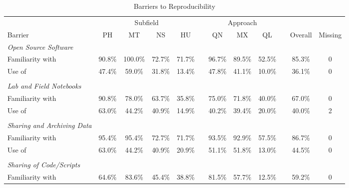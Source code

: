 \documentclass[]{interact}
\theoremstyle{plain}%
\theoremstyle{definition}
\theoremstyle{remark}
\begin{document}
\newpage
\begin{landscape}
\begin{table}[h]
    \centering
    \begin{threeparttable}
    \caption{Barriers to Reproducibility}
    \begin{tabular}{l c c c c c c c c c c c}
         \hline
                    & \multicolumn{4}{1}{Subfield}  & & \multicolumn{3}{1}{Approach} & & & \\
         Barrier                            & PH & MT & NS & HU                   & & QN & MX & QL           & & Overall & Missing \\
         \hline
         \textit{Open Source Software}      & & & & & & & & & & & \\
         Familiarity with                   & 90.8\% & 100.0\% & 72.7\% & 71.7\% & & 96.7\% & 89.5\% & 52.5\% & & 85.3\% & 0 \\
         Use of                             & 47.4\% & 59.0\% & 31.8\% & 13.4\% & & 47.8\% & 41.1\% & 10.0\% & & 36.1\% & 0 \\
                                            & & & & & & & & & & &\\
         \textit{Lab and Field Notebooks}   & & & & & & & & & & & \\
         Familiarity with                   & 90.8\% & 78.0\% & 63.7\% & 35.8\% & & 75.0\% & 71.8\% & 40.0\% & & 67.0\% & 0 \\
         Use of                             & 63.0\% & 44.2\% & 40.9\% & 14.9\% & & 40.2\% & 39.4\% & 20.0\% & & 40.0\% & 2 \\
                                            & & & & & & & & & & & \\
         \textit{Sharing and Archiving Data}     & & & & & & & & & & & \\
         Familiarity with                   & 95.4\% & 95.4\% & 72.7\% & 71.7\% & & 93.5\% & 92.9\% & 57.5\% & & 86.7\% & 0 \\
         Use of                             & 63.0\% & 44.2\% & 40.9\% & 20.9\% & & 51.1\% & 51.8\% & 13.0\% & & 44.5\% & 0 \\
                                            & & & & & & & & & & & \\
         \textit{Sharing of Code/Scripts}     & & & & & & & & & & & \\
         Familiarity with                   & 64.6\% & 83.6\% & 45.4\% & 38.8\% & & 81.5\% & 57.7\% & 12.5\% & & 59.2\% & 0 \\

\end{tabular}
\end{threeparttable}
\end{table}
\end{landscape}
\end{document}
